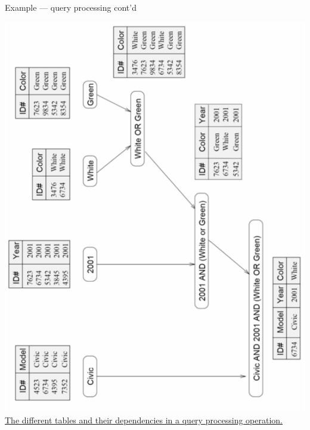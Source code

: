 \documentclass[10pt, t]{beamer}
\begin{document}
  \begin{frame}{Example --- query processing cont'd}
    \vspace{-3ex}
    \begin{center}
      \includegraphics[angle=-90,width=.80\textwidth]{query2}\\
      \hfill\tiny{\href{https://www.pearson.com/us/higher-education/program/Grama-Introduction-to-Parallel-Computing-2nd-Edition/PGM11645.html}{The different tables and their dependencies in a query processing operation.}}
    \end{center}

  \end{frame}
\end{document}
